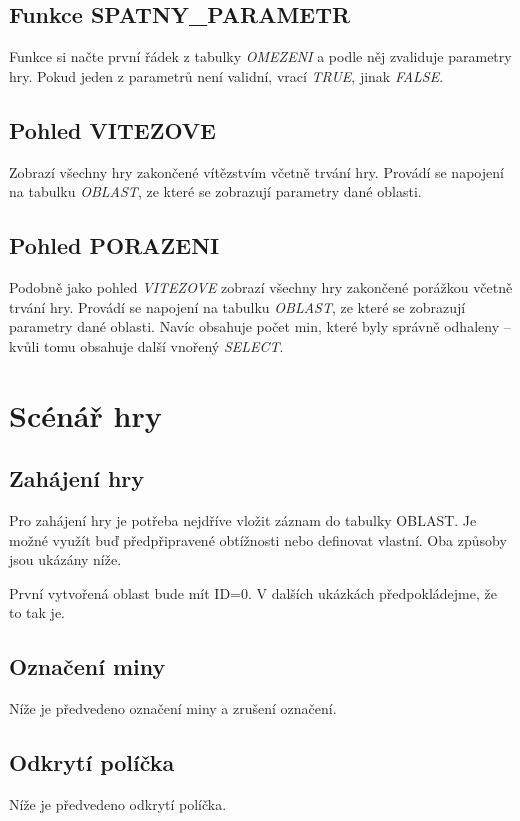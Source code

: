 \documentclass[12pt, a4paper]{article}
\begin{document}
\subsection{Funkce SPATNY\_PARAMETR}
Funkce si načte první řádek z tabulky \emph{OMEZENI} a podle něj zvaliduje parametry hry.
Pokud jeden z parametrů není validní, vrací \emph{TRUE}, jinak \emph{FALSE}.


\subsection{Pohled VITEZOVE}
Zobrazí všechny hry zakončené vítězstvím včetně trvání hry.
Provádí se napojení na tabulku \emph{OBLAST}, ze které se zobrazují parametry dané oblasti.


\subsection{Pohled PORAZENI}
Podobně jako pohled \emph{VITEZOVE} zobrazí všechny hry zakončené porážkou včetně trvání hry.
Provádí se napojení na tabulku \emph{OBLAST}, ze které se zobrazují parametry dané oblasti.
Navíc obsahuje počet min, které byly správně odhaleny – kvůli tomu obsahuje další vnořený \emph{SELECT}.


\section{Scénář hry}
\subsection{Zahájení hry}
Pro zahájení hry je potřeba nejdříve vložit záznam do tabulky OBLAST.
Je možné využít buď předpřipravené obtížnosti nebo definovat vlastní.
Oba způsoby jsou ukázány níže.


\noindent
První vytvořená oblast bude mít ID=0. V dalších ukázkách předpokládejme, že to tak je.

\subsection{Označení miny}
Níže je předvedeno označení miny a zrušení označení.


\subsection{Odkrytí políčka}
Níže je předvedeno odkrytí políčka.

\end{document}
